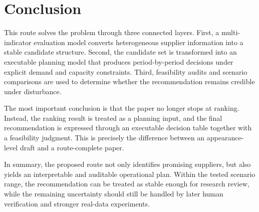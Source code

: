 \section{Conclusion}

This route solves the problem through three connected layers. First, a multi-indicator evaluation model converts heterogeneous supplier information into a stable candidate structure. Second, the candidate set is transformed into an executable planning model that produces period-by-period decisions under explicit demand and capacity constraints. Third, feasibility audits and scenario comparisons are used to determine whether the recommendation remains credible under disturbance.

The most important conclusion is that the paper no longer stops at ranking. Instead, the ranking result is treated as a planning input, and the final recommendation is expressed through an executable decision table together with a feasibility judgment. This is precisely the difference between an appearance-level draft and a route-complete paper.

In summary, the proposed route not only identifies promising suppliers, but also yields an interpretable and auditable operational plan. Within the tested scenario range, the recommendation can be treated as stable enough for research review, while the remaining uncertainty should still be handled by later human verification and stronger real-data experiments.
